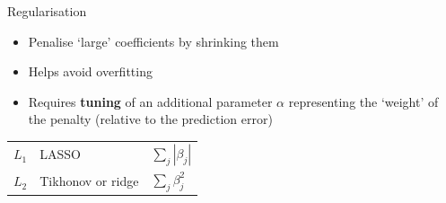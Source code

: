 \begin{frame}{Regularisation}
        \begin{itemize}
        \item Penalise `large' coefficients by shrinking them
        \item Helps avoid overfitting
        \item Requires \textbf{tuning} of an additional parameter $\alpha$
              representing the `weight' of the penalty (relative to the
              prediction error)
    \end{itemize}
    \vfill
    \begin{center}
        \renewcommand*{\arraystretch}{1.5}
        \begin{tabular}{lll}
            \toprule
            $L_{1}$ & LASSO & $\sum_{j} | \beta_{j} |$ \\
            $L_{2}$ & Tikhonov or ridge & $\sum_{j} \beta_{j}^{2}$ \\
            \bottomrule
        \end{tabular}
    \end{center}
\end{frame}



